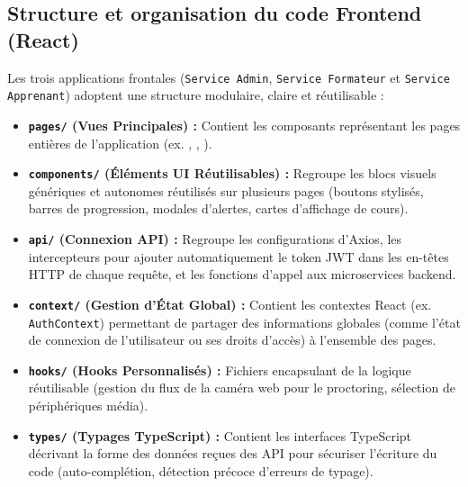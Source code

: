\subsection{Structure et organisation du code Frontend (React)}
Les trois applications frontales (\texttt{Service Admin}, \texttt{Service Formateur} et \texttt{Service Apprenant}) adoptent une structure modulaire, claire et réutilisable :
\begin{itemize}
    \item \textbf{\texttt{pages/} (Vues Principales) :} Contient les composants représentant les pages entières de l'application (ex. , , ).
    \item \textbf{\texttt{components/} (Éléments UI Réutilisables) :} Regroupe les blocs visuels génériques et autonomes réutilisés sur plusieurs pages (boutons stylisés, barres de progression, modales d'alertes, cartes d'affichage de cours).
    \item \textbf{\texttt{api/} (Connexion API) :} Regroupe les configurations d'Axios, les intercepteurs pour ajouter automatiquement le token JWT dans les en-têtes HTTP de chaque requête, et les fonctions d'appel aux microservices backend.
    \item \textbf{\texttt{context/} (Gestion d'État Global) :} Contient les contextes React (ex. \texttt{AuthContext}) permettant de partager des informations globales (comme l'état de connexion de l'utilisateur ou ses droits d'accès) à l'ensemble des pages.
    \item \textbf{\texttt{hooks/} (Hooks Personnalisés) : } Fichiers encapsulant de la logique réutilisable (gestion du flux de la caméra web pour le proctoring, sélection de périphériques média).
    \item \textbf{\texttt{types/} (Typages TypeScript) :} Contient les interfaces TypeScript décrivant la forme des données reçues des API pour sécuriser l'écriture du code (auto-complétion, détection précoce d'erreurs de typage).
\end{itemize}

